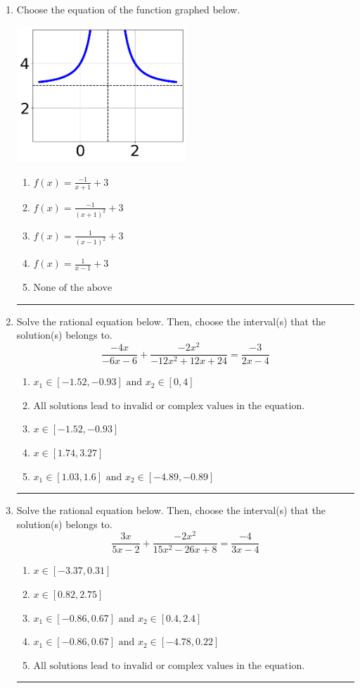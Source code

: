 \documentclass[14pt]{extbook}
\newcommand{\litem}[1]{\item#1\hspace*{-1cm}\rule{\textwidth}{0.4pt}}
\begin{document}
\begin{enumerate}
{\begin{enumerate}[label=\Alph*.]
\end{enumerate} }
\litem{
Choose the equation of the function graphed below.
\begin{center}
    \includegraphics[width=0.5\textwidth]{../Figures/rationalGraphToEquationA.png}
\end{center}
\begin{enumerate}[label=\Alph*.]
\item \( f(x) = \frac{-1}{x + 1} + 3 \)
\item \( f(x) = \frac{-1}{(x + 1)^2} + 3 \)
\item \( f(x) = \frac{1}{(x - 1)^2} + 3 \)
\item \( f(x) = \frac{1}{x - 1} + 3 \)
\item \( \text{None of the above} \)

\end{enumerate} }
\litem{
Solve the rational equation below. Then, choose the interval(s) that the solution(s) belongs to.\[ \frac{-4x}{-6x -6} + \frac{-2x^{2}}{-12x^{2} +12 x + 24} = \frac{-3}{2x -4} \]\begin{enumerate}[label=\Alph*.]
\item \( x_1 \in [-1.52, -0.93] \text{ and } x_2 \in [0,4] \)
\item \( \text{All solutions lead to invalid or complex values in the equation.} \)
\item \( x \in [-1.52,-0.93] \)
\item \( x \in [1.74,3.27] \)
\item \( x_1 \in [1.03, 1.6] \text{ and } x_2 \in [-4.89,-0.89] \)

\end{enumerate} }
\litem{
Solve the rational equation below. Then, choose the interval(s) that the solution(s) belongs to.\[ \frac{3x}{5x -2} + \frac{-2x^{2}}{15x^{2} -26 x + 8} = \frac{-4}{3x -4} \]\begin{enumerate}[label=\Alph*.]
\item \( x \in [-3.37,0.31] \)
\item \( x \in [0.82,2.75] \)
\item \( x_1 \in [-0.86, 0.67] \text{ and } x_2 \in [0.4,2.4] \)
\item \( x_1 \in [-0.86, 0.67] \text{ and } x_2 \in [-4.78,0.22] \)
\item \( \text{All solutions lead to invalid or complex values in the equation.} \)

\end{enumerate} }
\end{enumerate}
\end{document}
